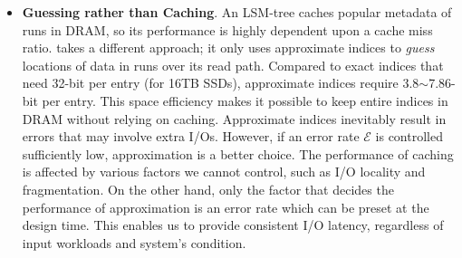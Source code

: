 \begin{itemize}[leftmargin=*]
\item \textbf{Guessing rather than Caching}.
An LSM-tree caches popular metadata of runs in DRAM,
so its performance is highly dependent upon a cache miss
ratio.  
\ours{} takes a different approach; it only uses approximate indices to
\textit{guess} locations of data in runs over its read path.  Compared to exact indices
that need 32-bit per entry (for 16TB SSDs), approximate indices require
3.8$\sim$7.86-bit per entry.  This space efficiency makes it possible
to keep entire
indices in DRAM without relying on caching.  Approximate indices inevitably
result in errors that may involve extra I/Os.
However, if an error rate $\mathcal{E}$ is controlled sufficiently low,
approximation is a better choice.  
The performance of caching is affected by
various factors we cannot control, such as I/O locality and fragmentation.
On the other hand, only the factor that decides the performance of
approximation is an error rate 
which can be preset at the design time.  This
enables us to provide consistent I/O latency, regardless of input workloads and
system's condition.


\begin{comment}
Our goal is to use approximate algorithms to eliminate the \textit{necessity}
of index tables in its read path.  \ours{} employs only two lightweight
approximate data structures, BFs and PLR models, in DRAM and uses them to
locate a physical sector of data to access.  No index tables are needed to find
a location of data. By keeping only memory-efficient data structures in the
memory, \ours{} can greatly reduce the amount of DRAM for the address
translation.


\end{comment}
\end{itemize}
